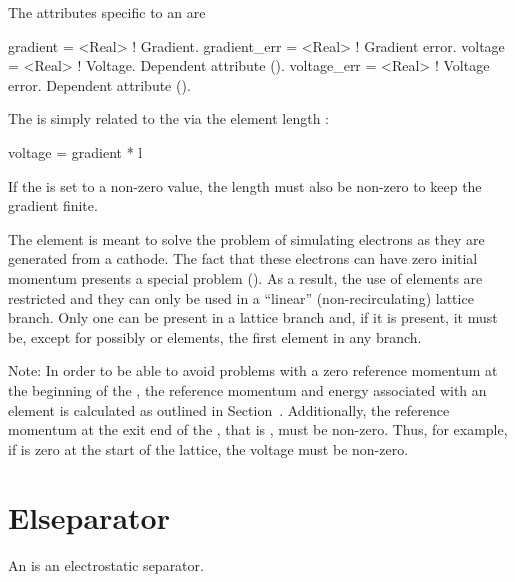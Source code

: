 The attributes specific to an  are 
\begin{example}
  gradient     = <Real>    ! Gradient.
  gradient_err = <Real>    ! Gradient error.
  voltage      = <Real>    ! Voltage. Dependent attribute (). 
  voltage_err  = <Real>    ! Voltage error. Dependent attribute (). 
\end{example}
The  is simply related to the  via the element length :
\begin{example}
  voltage = gradient * l
\end{example}
If the  is set to a non-zero value, the length  must
also be non-zero to keep the gradient finite.

The  element is meant to solve the problem of simulating
electrons as they are generated from a cathode. The fact that these
electrons can have zero initial momentum presents a special problem
(). As a result, the use of  elements are
restricted and they can only be used in a ``linear''
(non-recirculating) lattice branch. Only one  can be present
in a lattice branch and, if it is present, it must be, except for
possibly  or  elements, the first element in
any branch.
 
Note: In order to be able to avoid problems with a zero reference
momentum at the beginning of the , the reference momentum
and energy associated with an  element is calculated as
outlined in Section~. Additionally, the reference
momentum at the exit end of the , that is , must be
non-zero. Thus, for example, if  is zero at the start of the
lattice, the  voltage must be non-zero. 

\section{Elseparator}
\label{s:elsep}

An  is an electrostatic separator.

